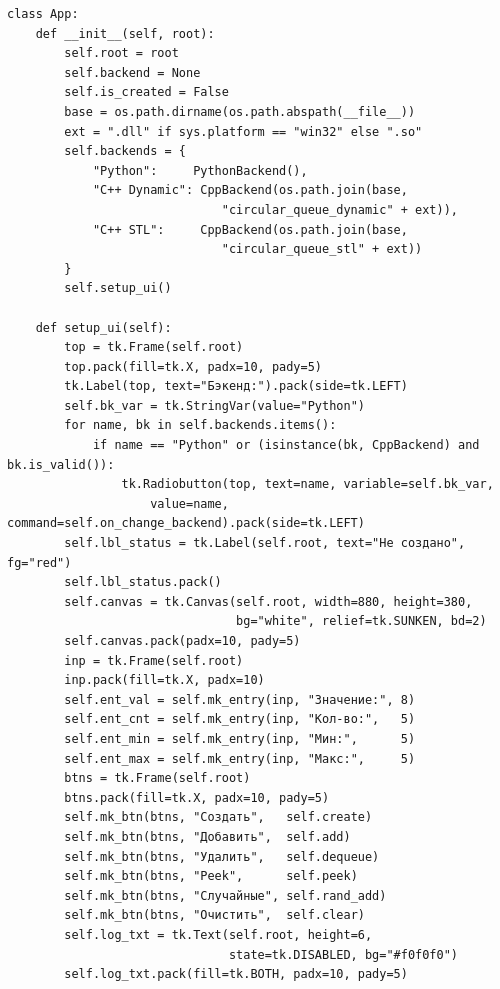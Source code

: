 \documentclass[oneside,a4paper,14pt]{extarticle}
\begin{document}
\newpage
\small
\begin{verbatim}
class App:
    def __init__(self, root):
        self.root = root
        self.backend = None
        self.is_created = False
        base = os.path.dirname(os.path.abspath(__file__))
        ext = ".dll" if sys.platform == "win32" else ".so"
        self.backends = {
            "Python":     PythonBackend(),
            "C++ Dynamic": CppBackend(os.path.join(base,
                              "circular_queue_dynamic" + ext)),
            "C++ STL":     CppBackend(os.path.join(base,
                              "circular_queue_stl" + ext))
        }
        self.setup_ui()

    def setup_ui(self):
        top = tk.Frame(self.root)
        top.pack(fill=tk.X, padx=10, pady=5)
        tk.Label(top, text="Бэкенд:").pack(side=tk.LEFT)
        self.bk_var = tk.StringVar(value="Python")
        for name, bk in self.backends.items():
            if name == "Python" or (isinstance(bk, CppBackend) and bk.is_valid()):
                tk.Radiobutton(top, text=name, variable=self.bk_var,
                    value=name, command=self.on_change_backend).pack(side=tk.LEFT)
        self.lbl_status = tk.Label(self.root, text="Не создано", fg="red")
        self.lbl_status.pack()
        self.canvas = tk.Canvas(self.root, width=880, height=380,
                                bg="white", relief=tk.SUNKEN, bd=2)
        self.canvas.pack(padx=10, pady=5)
        inp = tk.Frame(self.root)
        inp.pack(fill=tk.X, padx=10)
        self.ent_val = self.mk_entry(inp, "Значение:", 8)
        self.ent_cnt = self.mk_entry(inp, "Кол-во:",   5)
        self.ent_min = self.mk_entry(inp, "Мин:",      5)
        self.ent_max = self.mk_entry(inp, "Макс:",     5)
        btns = tk.Frame(self.root)
        btns.pack(fill=tk.X, padx=10, pady=5)
        self.mk_btn(btns, "Создать",   self.create)
        self.mk_btn(btns, "Добавить",  self.add)
        self.mk_btn(btns, "Удалить",   self.dequeue)
        self.mk_btn(btns, "Peek",      self.peek)
        self.mk_btn(btns, "Случайные", self.rand_add)
        self.mk_btn(btns, "Очистить",  self.clear)
        self.log_txt = tk.Text(self.root, height=6,
                               state=tk.DISABLED, bg="#f0f0f0")
        self.log_txt.pack(fill=tk.BOTH, padx=10, pady=5)


\end{verbatim}
\end{document}
